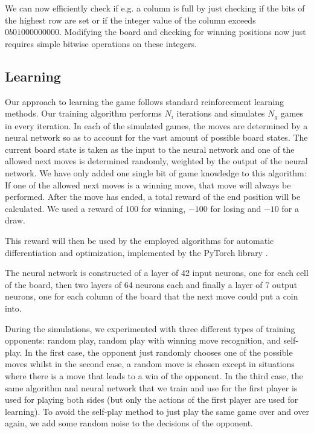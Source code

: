 \documentclass[10pt,twocolumn,letterpaper]{article}
\begin{document}
We can now efficiently check if e.g. a column is full by just checking if the bits of the highest row are set or if the integer value of the column exceeds $0b01000000000$.
Modifying the board and checking for winning positions now just requires simple bitwise operations on these integers.

\subsection{Learning}
Our approach to learning the game follows standard reinforcement learning methods.
Our training algorithm performs $N_i$ iterations and simulates $N_g$ games in every iteration.
In each of the simulated games, the moves are determined by a neural network so as to account for the vast amount of possible board states.
The current board state is taken as the input to the neural network and one of the allowed next moves is determined randomly, weighted by the output of the neural network.
We have only added one single bit of game knowledge to this algorithm: If one of the allowed next moves is a winning move, that move will always be performed.
After the move has ended, a total reward of the end position will be calculated.
We used a reward of $100$ for winning, $-100$ for losing and $-10$ for a draw.

This reward will then be used by the employed algorithms for automatic differentiation and optimization\cite{Adam}, implemented by the PyTorch library \cite{PyTorch}.

The neural network is constructed of a layer of 42 input neurons, one for each cell of the board, then two layers of 64 neurons each and finally a layer of 7 output neurons, one for each column of the board that the next move could put a coin into.

During the simulations, we experimented with three different types of training opponents: random play, random play with winning move recognition, and self-play.
In the first case, the opponent just randomly chooses one of the possible moves whilst in the second case, a random move is chosen except in situations where there is a move that leads to a win of the opponent.
In the third case, the same algorithm and neural network that we train and use for the first player is used for playing both sides (but only the actions of the first player are used for learning).
To avoid the self-play method to just play the same game over and over again, we add some random noise to the decisions of the opponent.
\end{document}
